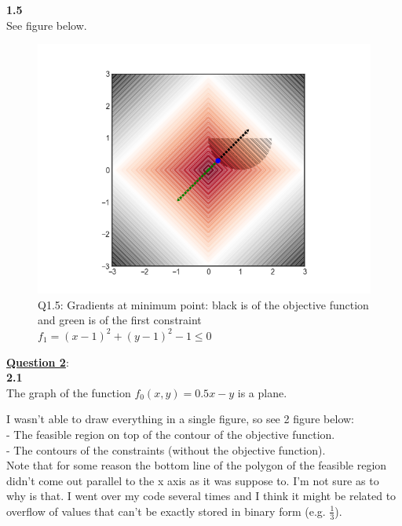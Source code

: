 \documentclass[fleqn]{article}
\begin{document}
\textbf{1.5} \\
See figure below. \\

\begin{figure}[h!]
\includegraphics[width=0.8\linewidth]{q1_5.PNG}
\caption{Q1.5: Gradients at minimum point: black is of the objective function and green is of the first constraint $f_1 = (x-1)^2+(y-1)^2-1 \leq 0$}
\end{figure}




\clearpage\underline{\textbf{Question 2}}:\\
\textbf{2.1} \\
The graph of the function $f_0(x,y) = 0.5x-y$ is a plane.

I wasn't able to draw everything in a single figure, so see 2 figure below:\\
- The feasible region on top of the contour of the objective function. \\
- The contours of the constraints (without the objective function). \\

Note that for some reason the bottom line of the polygon of the feasible region didn't come out parallel to the x axis as it was suppose to. I'm not sure as to why is that. I went over my code several times and I think it might be related to overflow of values that can't be exactly stored in binary form (e.g. $\frac{1}{3}$).\\
\end{document}
